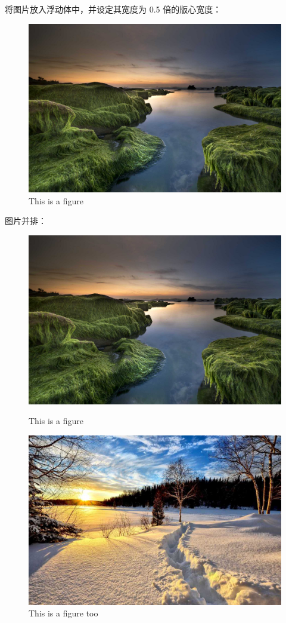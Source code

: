 \documentclass[UTF8,hyperref,space=auto]{ctexart} %
\theoremstyle{plain}
\theoremstyle{plain}
\theoremstyle{plain}
\theoremstyle{plain}
\theoremstyle{nonumberplain}
\begin{document}
将图片放入浮动体中，并设定其宽度为 0.5 倍的版心宽度：
\begin{figure}[H]
	\centering
	\includegraphics[width=0.5\linewidth]{2.jpg}
	\caption{This is a figure}
\end{figure}

图片并排：
\begin{figure}[H]
	\centering
	\begin{minipage}[t]{0.4\textwidth}
		\centering
		\includegraphics[width=\textwidth]{2.jpg}
		\caption{This is a figure}
	\end{minipage}
	\quad
	\begin{minipage}[t]{0.4\textwidth}
		\centering
		\includegraphics[width=\textwidth]{3.jpg}
		\caption{This is a figure too}
	\end{minipage}
\end{figure}
\end{document}
